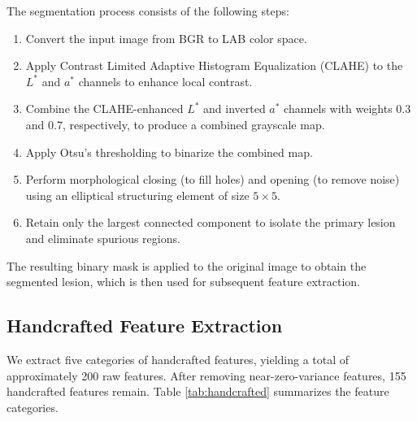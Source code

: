 \documentclass[conference]{IEEEtran}
\begin{document}
The segmentation process consists of the following steps:
\begin{enumerate}
    \item Convert the input image from BGR to LAB color space.
    \item Apply Contrast Limited Adaptive Histogram Equalization
          (CLAHE) to the $L^*$ and $a^*$ channels to enhance local
          contrast.
    \item Combine the CLAHE-enhanced $L^*$ and inverted $a^*$
          channels with weights 0.3 and 0.7, respectively, to
          produce a combined grayscale map.
    \item Apply Otsu's thresholding to binarize the combined map.
    \item Perform morphological closing (to fill holes) and opening
          (to remove noise) using an elliptical structuring element
          of size $5 \times 5$.
    \item Retain only the largest connected component to isolate the
          primary lesion and eliminate spurious regions.
\end{enumerate}

The resulting binary mask is applied to the original image to obtain
the segmented lesion, which is then used for subsequent feature
extraction.

\subsection{Handcrafted Feature Extraction}

We extract five categories of handcrafted features, yielding a total
of approximately 200 raw features. After removing near-zero-variance
features, 155 handcrafted features remain. Table
\ref{tab:handcrafted} summarizes the feature categories.
\end{document}
